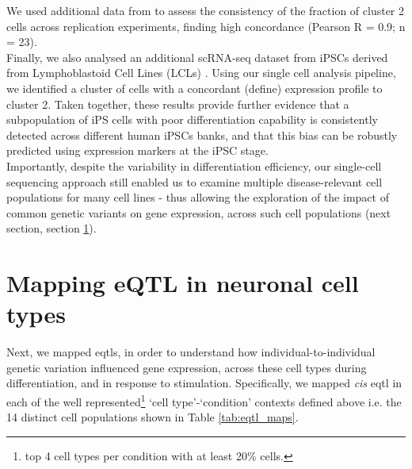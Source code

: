 We used additional data from \cite{cuomo2020single} to assess the consistency of the fraction of cluster 2 cells across replication experiments, finding high concordance (Pearson R = 0.9; n = 23).
\\

Finally, we also analysed an additional scRNA-seq dataset from iPSCs derived from Lymphoblastoid Cell Lines (LCLs) \cite{sarkar2019discovery}. 
Using our single cell analysis pipeline, we identified a cluster of cells with a concordant (define) expression profile to cluster 2. 
Taken together, these results provide further evidence that a subpopulation of iPS cells with poor differentiation capability is consistently detected across different human iPSCs banks, and that this bias can be robustly predicted using expression markers at the iPSC stage. \\

Importantly, despite the variability in differentiation efficiency, our single-cell sequencing approach still enabled us to examine multiple disease-relevant cell populations for many cell lines - thus allowing the exploration of the impact of common genetic variants on gene expression, across such cell populations (next section, section \ref{sec:neuroseq_eqt}).


\newpage

\section{Mapping eQTL in neuronal cell types}
\label{sec:neuroseq_eqt}

Next, we mapped \glspl{eqtl}, in order to understand how individual-to-individual genetic variation influenced gene expression, across these cell types during differentiation, and in response to stimulation.
Specifically, we mapped \textit{cis} \gls{eqtl} in each of the well represented\footnote{top 4 cell types per condition with at least 20\% cells.} `cell type'-`condition' contexts defined above
i.e.
the 14 distinct cell populations shown in Table \ref{tab:eqtl_maps}. 

